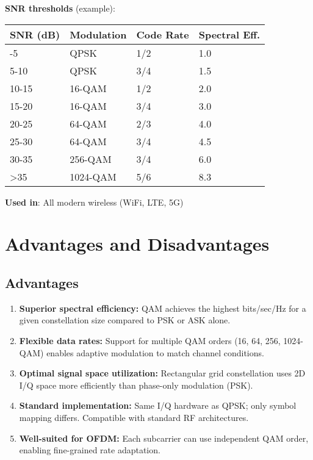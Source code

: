 \textbf{SNR thresholds} (example):

{\def\LTcaptype{} %
\begin{longtable}[]{@{}llll@{}}
\toprule\noalign{}
SNR (dB) & Modulation & Code Rate & Spectral Eff. \\
\midrule\noalign{}
\endhead
\bottomrule\noalign{}
\endlastfoot
0-5 & QPSK & 1/2 & 1.0 \\
5-10 & QPSK & 3/4 & 1.5 \\
10-15 & 16-QAM & 1/2 & 2.0 \\
15-20 & 16-QAM & 3/4 & 3.0 \\
20-25 & 64-QAM & 2/3 & 4.0 \\
25-30 & 64-QAM & 3/4 & 4.5 \\
30-35 & 256-QAM & 3/4 & 6.0 \\
\textgreater35 & 1024-QAM & 5/6 & 8.3 \\
\end{longtable}
}

\textbf{Used in}: All modern wireless (WiFi, LTE, 5G)

\section{Advantages and Disadvantages}

\subsection*{Advantages}

\begin{enumerate}
\item \textbf{Superior spectral efficiency:} QAM achieves the highest bits/sec/Hz for a given constellation size compared to PSK or ASK alone.

\item \textbf{Flexible data rates:} Support for multiple QAM orders (16, 64, 256, 1024-QAM) enables adaptive modulation to match channel conditions.

\item \textbf{Optimal signal space utilization:} Rectangular grid constellation uses 2D I/Q space more efficiently than phase-only modulation (PSK).

\item \textbf{Standard implementation:} Same I/Q hardware as QPSK; only symbol mapping differs. Compatible with standard RF architectures.

\item \textbf{Well-suited for OFDM:} Each subcarrier can use independent QAM order, enabling fine-grained rate adaptation.
\end{enumerate}

